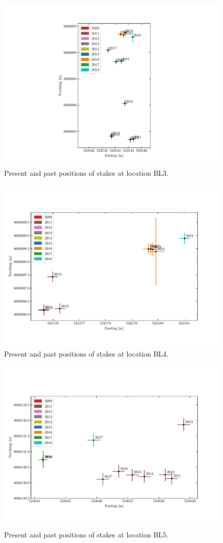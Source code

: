 \begin{figure}[H]
    \centering
    \includegraphics[width=.9\textwidth]{./figs/BL3_2d.pdf}
    \caption{Present and past positions of stakes at location BL3.}
    \label{GPS:fig:BL3_2d}
\end{figure}

\begin{figure}[H]
    \centering
    \includegraphics[width=.9\textwidth]{./figs/BL4_2d.pdf}
    \caption{Present and past positions of stakes at location BL4.}
    \label{GPS:fig:BL4_2d}
\end{figure}

\begin{figure}[H]
    \centering
    \includegraphics[width=.9\textwidth]{./figs/BL5_2d.pdf}
    \caption{Present and past positions of stakes at location BL5.}
    \label{GPS:fig:BL5_2d}
\end{figure}

